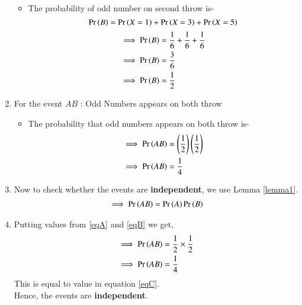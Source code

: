 \documentclass[journal,12pt,twocolumn]{IEEEtran}
\begin{document}
\begin{enumerate}
\begin{itemize}
    \item The probability of odd number on second throw is-
    \begin{equation}
    \Pr\left(B\right)=\Pr\left(X=1\right)+\Pr\left(X=3\right)+\Pr\left(X=5\right)
\end{equation}
\begin{align}
\implies \Pr\left(B\right)&=\frac{1}{6}+\frac{1}{6}+\frac{1}{6}
\\
\implies  \Pr\left(B\right) &= \frac{3}{6} 
\\
\implies  \Pr\left(B\right)&= \frac{1}{2} \label{eqB}
 \end{align}
 \end{itemize}
\item For the event $AB$ : Odd Numbers appears on both throw
\begin{itemize}
    \item The probability that odd numbers appears on both throw is-
\begin{align}
\implies  \Pr\left(AB\right) &= \left(\frac{1}{2}\right)\left( \frac{1}{2} \right)
\\
\implies  \Pr\left(AB\right) &= \frac{1}{4} \label{eqC}
 \end{align}
 \end{itemize}
\item Now to check whether the events are \textbf{independent}, we use Lemma \eqref{lemma1}.
\begin{align}
 \implies   \Pr\left(AB\right)= \Pr\left(A\right)\Pr\left(B\right)
    \end{align}
    \item Putting values from \eqref{eqA} and \eqref{eqB} we get,
    \begin{align}
  \implies  \Pr\left(AB\right) & = \frac{1}{2}\times\frac{1}{2}
    \\
\implies    \Pr\left(AB\right)&= \frac{1}{4}
\end{align}
This is equal to value in equation \eqref{eqC}.
\\
Hence, the events are \textbf{independent}.
\end{enumerate}
\end{document}
